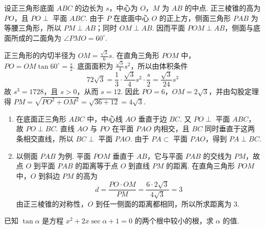 \begin{solution}
设正三角形底面 \(ABC\) 的边长为 \(s\)，中心为 \(O\)，\(M\) 为 \(AB\) 的中点. 正三棱锥的高为 \(PO\)，且 \(PO\perp\) 平面 \(ABC\). 由于 \(P\) 在底面中心 \(O\) 的正上方，侧面三角形 \(PAB\) 为等腰三角形，所以 \(PM\perp AB\)；同时 \(OM\perp AB\). 因而平面 \(POM\perp AB\)，侧面与底面所成的二面角为 \(\angle PMO=60^\circ\).

正三角形的内切半径为
\(\displaystyle OM=\frac{\sqrt3}{6}s\). 在直角三角形 \(POM\) 中，
\(\displaystyle PO=OM\tan60^\circ=\frac{s}{2}\).
底面面积为 \(\displaystyle\frac{\sqrt3}{4}s^2\)，所以由体积条件
\[
72\sqrt3=\frac13\cdot\frac{\sqrt3}{4}s^2\cdot\frac{s}{2}
=\frac{\sqrt3}{24}s^3
\]
故 \(s^3=1728\)，且 \(s>0\)，从而 \(s=12\). 因此
\(PO=6\)，\(OM=2\sqrt3\)，并由勾股定理得
\(PM=\sqrt{PO^2+OM^2}=\sqrt{36+12}=4\sqrt3\).

\begin{enumerate}
\item 在底面正三角形 \(ABC\) 中，中心线 \(AO\) 垂直于边 \(BC\). 又 \(PO\perp\) 平面 \(ABC\)，故 \(PO\perp BC\). 直线 \(AO\) 与 \(PO\) 在平面 \(PAO\) 内相交，且 \(BC\) 同时垂直于这两条相交直线，所以 \(BC\perp\) 平面 \(PAO\). 由于 \(PA\subset\) 平面 \(PAO\)，得到 \(PA\perp BC\).

\item 以侧面 \(PAB\) 为例. 平面 \(POM\) 垂直于 \(AB\)，它与平面 \(PAB\) 的交线为 \(PM\)，故点 \(O\) 到平面 \(PAB\) 的距离等于点 \(O\) 到直线 \(PM\) 的距离. 在直角三角形 \(POM\) 中，\(O\) 到斜边 \(PM\) 的高为
\[
d=\frac{PO\cdot OM}{PM}
=\frac{6\cdot2\sqrt3}{4\sqrt3}=3
\]
由正三棱锥的对称性，\(O\) 到任一侧面的距离都相同，所以所求距离为 \(3\).
\end{enumerate}
\end{solution}

\begin{problem}
已知 \(\tan \alpha\) 是方程 \(x^{2} + 2x\sec \alpha + 1 = 0\) 的两个根中较小的根，求 \(\alpha\) 的值.
\end{problem}

